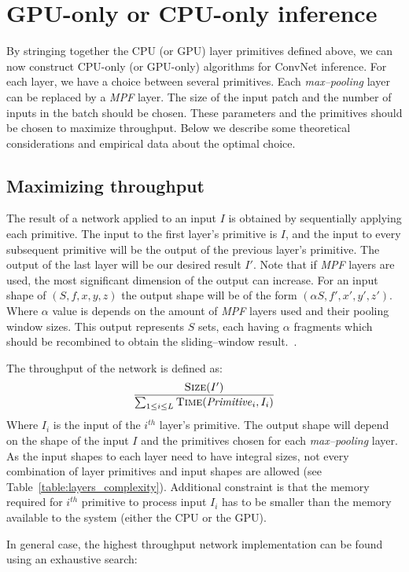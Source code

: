 \documentclass[conference]{./IEEEtran/IEEEtran}
\begin{document}
\section{GPU-only or CPU-only inference}
  By stringing together the CPU (or GPU) layer primitives defined
  above, we can now construct CPU-only (or GPU-only) algorithms for
  ConvNet inference.  For each layer, we have a choice between several
  primitives.  Each \emph{max--pooling} layer can be replaced by
  a \emph{MPF} layer.  The size of the input patch and the number of
  inputs in the batch should be chosen.  These parameters and the
  primitives should be chosen to maximize throughput.  Below we
  describe some theoretical considerations and empirical data about
  the optimal choice.

\subsection{Maximizing throughput}
  The result of a network applied to an input $I$ is obtained by
  sequentially applying each primitive.  The input to the first layer's
  primitive is $I$, and the input to every subsequent primitive will
  be the output of the previous layer's primitive.  The output of the
  last layer will be our desired result $I'$.  Note that if \emph{MPF}
  layers are used, the most significant dimension of the output can
  increase.  For an input shape of $(S,f,x,y,z)$ the output shape will
  be of the form $(\alpha S,f',x',y',z')$.  Where $\alpha$ value is
  depends on the amount of \emph{MPF} layers used and their pooling
  window sizes.  This output represents $S$ sets, each having $\alpha$
  fragments which should be recombined to obtain the sliding--window
  result.~\cite{giusti2013fast,masci2013fast}.

  The throughput of the network is defined as:
  \[
  \frac{\proc{Size}(I')}{\sum_{1 \le i \le L}
    \proc{Time}(\id{Primitive}_i,I_i)}
  \]
  Where $I_i$ is the input of the $i^{th}$ layer's primitive.  The
  output shape will depend on the shape of the input $I$ and the
  primitives chosen for each \emph{max--pooling} layer.  As the input
  shapes to each layer need to have integral sizes, not every
  combination of layer primitives and input shapes are allowed (see
  Table~\ref{table:layers_complexity}).  Additional constraint is that
  the memory required for $i^{th}$ primitive to process input $I_i$
  has to be smaller than the memory available to the system (either
  the CPU or the GPU).

  In general case, the highest throughput network implementation can
  be found using an exhaustive search:
\end{document}
